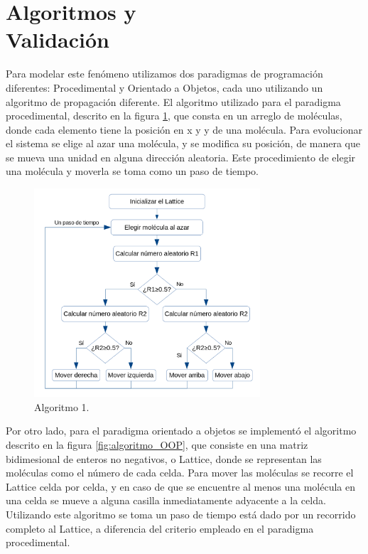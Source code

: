 \documentclass[12pt,twocolumn]{article}
\begin{document}
\section{Algoritmos y \\ Validación}

Para modelar este fenómeno utilizamos dos paradigmas de programación diferentes: Procedimental 
y Orientado a Objetos, cada uno utilizando un algoritmo de propagación diferente. El 
algoritmo utilizado para el paradigma procedimental, descrito en la figura 
\ref{fig:algoritmo_Proc}, que consta en un arreglo de moléculas, donde cada elemento tiene 
la posición en x y y de una molécula. Para evolucionar el sistema se elige al azar una molécula, 
y se modifica su posición, de manera que se mueva una unidad en alguna dirección aleatoria. 
Este procedimiento de elegir una molécula y moverla se toma como un paso de tiempo.
\\
\begin{figure}
    \centering
    \includegraphics[width=0.75\textwidth]{figs/Algoritmo_Proc.png}
    \caption{Algoritmo 1.}
    \label{fig:algoritmo_Proc}
\end{figure}

Por otro lado, para el paradigma orientado a objetos se implementó el algoritmo descrito 
en la figura \ref{fig:algoritmo_OOP}, que consiste en una matriz bidimesional de enteros no 
negativos, o Lattice, donde se representan las moléculas como el número de cada celda. Para 
mover las moléculas se recorre el Lattice celda por celda, y en caso de que se encuentre al 
menos una molécula en una celda se mueve a alguna casilla inmediatamente adyacente a la celda. 
Utilizando este algoritmo se toma un paso de tiempo está dado por un recorrido completo al 
Lattice, a diferencia del criterio empleado en el paradigma procedimental. 
\\
\end{document}
